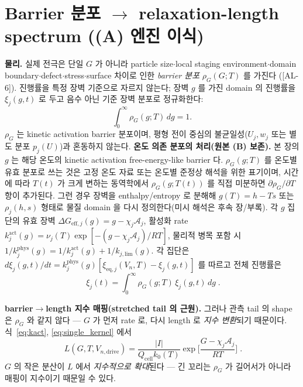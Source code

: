 \documentclass[11pt,a4paper]{article}
\newcommand{\eff}{\mathrm{eff}}
\newcommand{\eq}{\mathrm{eq}}
\newcommand{\drive}{\mathrm{drive}}
\newcommand{\cell}{\mathrm{cell}}
\newcommand{\AL}[1]{\textsf{[AL-#1]}}
\begin{document}
\section{Barrier 분포 $\to$ relaxation-length spectrum ((A) 엔진 이식)}\label{sec:spectrum}
\textbf{물리.} 실제 전극은 단일 $G$ 가 아니라 particle size$\cdot$local staging environment$\cdot$domain
boundary$\cdot$defect$\cdot$stress$\cdot$surface 차이로 인한 \emph{barrier 분포} $\rho_G(G;T)$ 를 가진다
(\AL{6}). 진행률을 특정 장벽 기준으로 자르지 않는다; 장벽 $g$ 를 가진 domain 의 진행률을 $\xi_j(g,t)$ 로
두고 음수 아닌 기준 장벽 분포로 정규화한다:
\begin{equation}
\int_0^\infty \rho_G(g;T)\,dg=1.
\label{eq:rho_norm}
\end{equation}
$\rho_G$ 는 kinetic activation barrier 분포이며, 평형 전이 중심의 불균일성($U_j,w_j$ 또는 별도 분포
$p_j(U)$)과 혼동하지 않는다.
\textbf{온도 의존 분포의 처리(원본 (B) 보존).} 본 장의 $g$ 는 해당 온도의 kinetic activation
free-energy-like barrier 다. $\rho_G(g;T)$ 를 온도별 유효 분포로 쓰는 것은 고정 온도 자료 또는 온도별
준정상 해석을 위한 표기이며, 시간에 따라 $T(t)$ 가 크게 변하는 동역학에서 $\rho_G(g;T(t))$ 를 직접 미분하면
$\partial\rho_G/\partial T$ 항이 추가된다. 그런 경우 장벽을 enthalpy/entropy 로 분해해 $g(T)=h-Ts$ 또는
$\rho_j(h,s)$ 형태로 물질 domain 을 다시 정의한다(미시 해석은 후속 장/부록).
각 $g$ 집단의 유효 장벽 $\Delta G_{\eff,j}(g)=g-\chi_j\mathcal A_j$, 활성화
rate $k_j^\mathrm{act}(g)=\nu_j(T)\exp[-(g-\chi_j\mathcal A_j)/RT]$, 물리적 병목 포함 시
$1/k_j^\mathrm{phys}(g)=1/k_j^\mathrm{act}(g)+1/k_{j,\mathrm{lim}}(g)$. 각 집단은
$d\xi_j(g,t)/dt=k_j^\mathrm{phys}(g)[\xi_{\eq,j}(V_n,T)-\xi_j(g,t)]$ 를 따르고 전체 진행률은
\begin{equation}
\boxed{\;\xi_j(t)=\int_0^\infty \rho_G(g;T)\,\xi_j(g,t)\,dg\;.}
\label{eq:xi_dist}
\end{equation}

\textbf{barrier$\to$length 지수 매핑(stretched tail 의 근원).} 그러나 관측 tail 의 shape 은 $\rho_G$ 와
같지 않다 — $G$ 가 먼저 rate 로, 다시 length 로 \emph{지수 변환}되기 때문이다. 식~\eqref{eq:kact},
\eqref{eq:single_kernel} 에서
\begin{equation}
\boxed{\;L(G,T,V_{n,\drive})=\frac{|I|}{Q_\cell k_0(T)}\exp\!\Big[\frac{G-\chi_j\mathcal A_j}{RT}\Big]\;.}
\label{eq:L_of_G}
\end{equation}
$G$ 의 작은 분산이 $L$ 에서 \emph{지수적으로 확대}된다 — 긴 꼬리는 $\rho_G$ 가 길어서가 아니라 매핑이
지수이기 때문일 수 있다.
\end{document}
